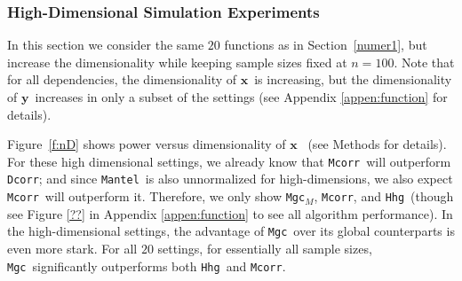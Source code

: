 \documentclass[11pt]{article}
\providecommand{\sct}[1]{{\sc \texttt{#1}}}
\providecommand{\mb}[1]{\boldsymbol{#1}}
\newcommand{\Mgc}{\sct{Mgc}}
\newcommand{\Mgcm}{\sct{Mgc$_M$}}
\newcommand{\Hhg}{\sct{Hhg}}
\newcommand{\Dcorr}{\sct{Dcorr}}
\newcommand{\Mcorr}{\sct{Mcorr}}
\newcommand{\Mantel}{\sct{Mantel}}
\newcommand{\mbx}{\ensuremath{\mb{x}}}
\newcommand{\mby}{\ensuremath{\mb{y}}}
\begin{document}
\subsubsection{High-Dimensional Simulation Experiments}
\label{numer2}

In this section we consider the same $20$ functions as in Section~\ref{numer1}, but increase the dimensionality while keeping sample sizes fixed  at $n=100$. 
Note that for all dependencies, the dimensionality of \mbx~is increasing, but the dimensionality of \mby~increases in only a subset of the settings (see Appendix \ref{appen:function} for details).

Figure~\ref{f:nD} shows power versus dimensionality of \mbx~
(see Methods for details).  
For these high dimensional settings, we already know that \Mcorr~will outperform \Dcorr; and since \Mantel~is also unnormalized for high-dimensions, we also expect \Mcorr~will outperform it.  Therefore, we only show \Mgcm, \Mcorr, and \Hhg~(though see Figure \ref{??} in Appendix \ref{appen:function} to see all algorithm performance).
In the high-dimensional settings, the advantage of \Mgc~over its global counterparts is even more stark. For all $20$ settings, for essentially all sample sizes, \Mgc~significantly outperforms both \Hhg~and \Mcorr.

\end{document}
